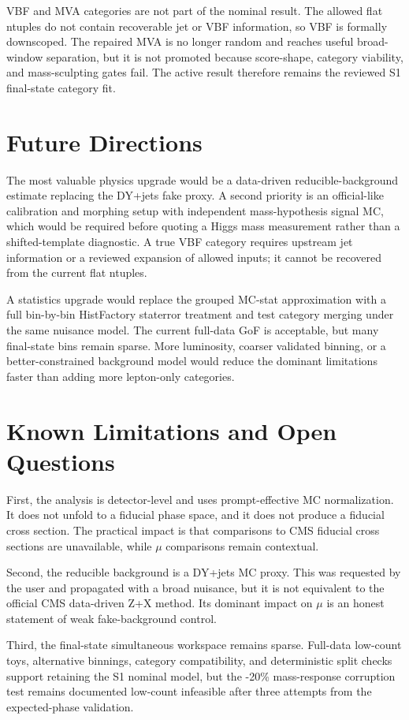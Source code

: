 \documentclass[11pt]{article}
\begin{document}
VBF and MVA categories are not part of the nominal result. The allowed flat ntuples do not contain recoverable jet or VBF information, so VBF is formally downscoped. The repaired MVA is no longer random and reaches useful broad-window separation, but it is not promoted because score-shape, category viability, and mass-sculpting gates fail. The active result therefore remains the reviewed S1 final-state category fit.

\section{Future Directions}
The most valuable physics upgrade would be a data-driven reducible-background estimate replacing the DY+jets fake proxy. A second priority is an official-like calibration and morphing setup with independent mass-hypothesis signal MC, which would be required before quoting a Higgs mass measurement rather than a shifted-template diagnostic. A true VBF category requires upstream jet information or a reviewed expansion of allowed inputs; it cannot be recovered from the current flat ntuples.

A statistics upgrade would replace the grouped MC-stat approximation with a full bin-by-bin HistFactory staterror treatment and test category merging under the same nuisance model. The current full-data GoF is acceptable, but many final-state bins remain sparse. More luminosity, coarser validated binning, or a better-constrained background model would reduce the dominant limitations faster than adding more lepton-only categories.

\section{Known Limitations and Open Questions}
First, the analysis is detector-level and uses prompt-effective MC normalization. It does not unfold to a fiducial phase space, and it does not produce a fiducial cross section. The practical impact is that comparisons to CMS fiducial cross sections are unavailable, while $\mu$ comparisons remain contextual.

Second, the reducible background is a DY+jets MC proxy. This was requested by the user and propagated with a broad nuisance, but it is not equivalent to the official CMS data-driven Z+X method. Its dominant impact on $\mu$ is an honest statement of weak fake-background control.

Third, the final-state simultaneous workspace remains sparse. Full-data low-count toys, alternative binnings, category compatibility, and deterministic split checks support retaining the S1 nominal model, but the -20\% mass-response corruption test remains documented low-count infeasible after three attempts from the expected-phase validation.
\end{document}
